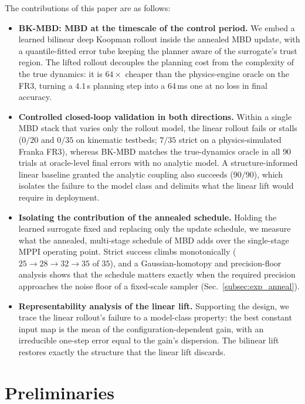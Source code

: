 \documentclass[lettersize,journal]{IEEEtran}
\theoremstyle{remark}
\newcommand{\bkmbd}{\textsc{BK-MBD}}
\begin{document}
The contributions of this paper are as follows:
\begin{itemize}
\item \textbf{\bkmbd{}: MBD at the timescale of the control period.} We
embed a learned bilinear deep Koopman rollout inside the annealed MBD
update, with a quantile-fitted error tube keeping the planner aware of
the surrogate's trust region. The lifted rollout decouples the planning
cost from the complexity of the true dynamics: it is $64\times$ cheaper
than the physics-engine oracle on the FR3, turning a $4.1$\,s planning
step into a $64$\,ms one at no loss in final accuracy.
\item \textbf{Controlled closed-loop validation in both directions.}
Within a single MBD stack that varies only the rollout model, the linear
rollout fails or stalls ($0/20$ and $0/35$ on kinematic testbeds; $7/35$
strict on a physics-simulated Franka FR3), whereas \bkmbd{} matches the
true-dynamics oracle in all $90$ trials at oracle-level final errors
with no analytic model. A structure-informed linear baseline granted
the analytic coupling also succeeds ($90/90$), which isolates the
failure to the model class and delimits what the linear lift would
require in deployment.
\item \textbf{Isolating the contribution of the annealed schedule.}
Holding the learned surrogate fixed and replacing only the update
schedule, we measure what the annealed, multi-stage schedule of MBD
adds over the single-stage MPPI operating point. Strict success climbs
monotonically ($25 \to 28 \to 32 \to 35$ of $35$), and a
Gaussian-homotopy and precision-floor analysis shows that the schedule
matters exactly when the required precision approaches the noise floor
of a fixed-scale sampler (Sec.~\ref{subsec:exp_anneal}).
\item \textbf{Representability analysis of the linear lift.} Supporting
the design, we trace the linear rollout's failure to a model-class
property: the best constant input map is the mean of the
configuration-dependent gain, with an irreducible one-step error equal
to the gain's dispersion. The bilinear lift restores exactly the
structure that the linear lift discards.
\end{itemize}

\section{Preliminaries}\label{sec:prelim}
\end{document}
